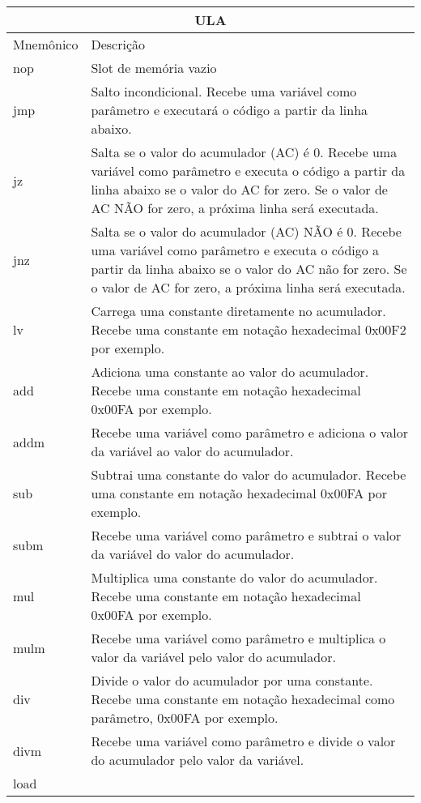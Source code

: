\vspace{1cm}
\begin{longtable}{ |p{3cm}||p{11cm}|  }
  \hline
  \multicolumn{2}{|c|}{ULA} \\
  \hline
  Mnemônico &
  Descrição\\
  \hline
  nop &
  Slot de memória vazio \\
  \hline
  jmp &
  Salto incondicional. Recebe uma variável como parâmetro e executará o código a partir da linha abaixo. \\
  \hline
  jz &
  Salta se o valor do acumulador (AC) é 0. Recebe uma variável como parâmetro e executa o código a partir da linha abaixo se o valor do AC for zero. Se o valor de AC NÃO for zero, a próxima linha será executada. \\
  \hline
  jnz &
  Salta se o valor do acumulador (AC) NÃO é 0. Recebe uma variável como parâmetro e executa o código a partir da linha abaixo se o valor do AC não for zero. Se o valor de AC for zero, a próxima linha será executada. \\
  \hline
  lv &
  Carrega uma constante diretamente no acumulador. Recebe uma constante em notação hexadecimal 0x00F2 por exemplo. \\
  \hline
  add &
  Adiciona uma constante ao valor do acumulador. Recebe uma constante em notação hexadecimal 0x00FA por exemplo. \\
  \hline
  addm &
  Recebe uma variável como parâmetro e adiciona o valor da variável ao valor do acumulador. \\
  \hline
  sub &
  Subtrai uma constante do valor do acumulador. Recebe uma constante em notação hexadecimal 0x00FA por exemplo. \\
  \hline
  subm &
  Recebe uma variável como parâmetro e subtrai o valor da variável do valor do acumulador. \\
  \hline
  mul &
  Multiplica uma constante do valor do acumulador. Recebe uma constante em notação hexadecimal 0x00FA por exemplo. \\
  \hline
  mulm &
  Recebe uma variável como parâmetro e multiplica o valor da variável pelo valor do acumulador. \\
  \hline
  div &
  Divide o valor do acumulador por uma constante. Recebe uma constante em notação hexadecimal como parâmetro, 0x00FA por exemplo. \\
  \hline
  divm &
  Recebe uma variável como parâmetro e divide o valor do acumulador pelo valor da variável. \\
  \hline
  load &

\end{longtable}
